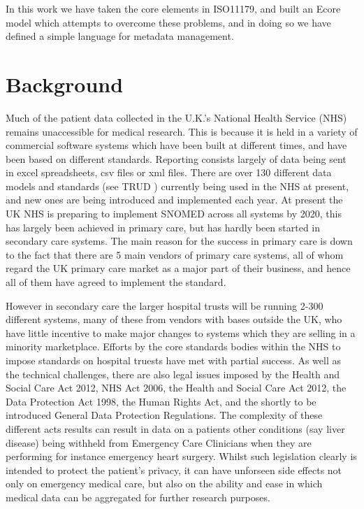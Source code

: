 \documentclass{llncs}
\begin{document}
In this work we have taken the core elements in ISO11179, and built an Ecore model which attempts to overcome these problems, and in doing so we have defined a simple language for metadata management.


\section{Background}

Much of the patient data collected in the U.K.'s National Health Service (NHS) remains unaccessible for medical research. This is because it is held in a variety of commercial software systems which have been built at different times, and have been based on different standards. Reporting consists largely of data being sent in excel spreadsheets, csv files or xml files.  There are over 130 different data models and standards (see TRUD \cite{TRUD}) currently being used in the NHS at present, and new ones are being introduced and implemented each year. At present the UK NHS is preparing to implement SNOMED across all systems by 2020, this has largely been achieved in primary care, but has hardly been started in secondary care systems. The main reason for the success in primary care is down to the fact that there are 5 main vendors of primary care systems, all of whom regard the UK primary care market as a major part of their business, and hence all of them have agreed to implement the standard.  

However in secondary care the larger hospital trusts will be running 2-300 different systems, many of these from vendors with bases outside the UK, who have little incentive to make major changes to systems which they are selling in a minority marketplace. Efforts by the core standards bodies within the NHS to impose standards on hospital truests have met with partial success. As well as the technical challenges, there are also legal issues imposed by the Health and Social Care Act 2012, NHS Act 2006, the Health and Social Care Act 2012, the Data Protection Act 1998, the Human Rights Act, and the shortly to be introduced General Data Protection Regulations.  The complexity of these different acts results can result in data on a patients other conditions (say liver disease) being withheld from Emergency Care Clinicians when they are performing for instance emergency heart surgery. Whilst such legislation clearly is intended to protect the patient's privacy, it can have unforseen side effects not only on emergency medical care, but also on the ability and ease in which medical data can be aggregated for further research purposes.
\end{document}
